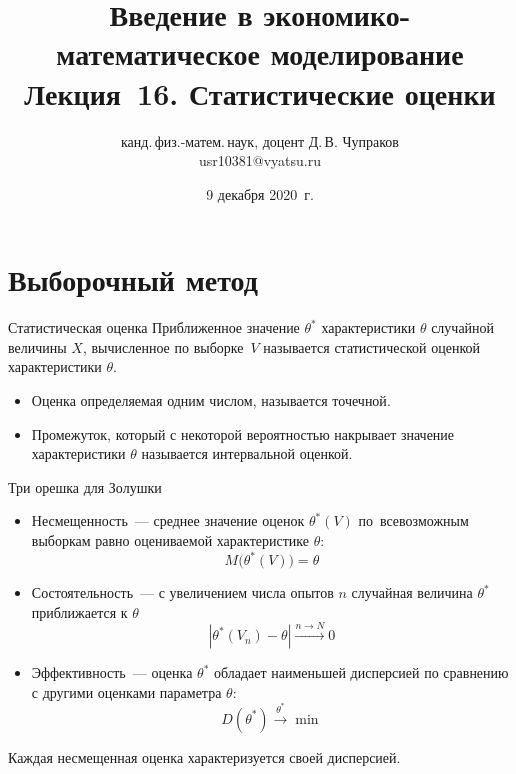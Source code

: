 \documentclass[unicode,11pt,notheorems,xcolor=table]{beamer}
\author[Д.\,В. Чупраков]{канд.\,физ.-матем.\,наук, доцент Д.\,В. Чупраков\\[6pt] usr10381@vyatsu.ru}
\institute[ВятГУ]{ФГБОУ ВО Вятский государственный университет}
\title[Лекция~17. Статистические оценки]{
	Введение в экономико-математическое моделирование\\[12pt]
	Лекция~16. Статистические оценки}
\date{9 декабря 2020~г.}
\begin{document}
\maketitle


\section{Выборочный метод}

\begin{frame}{Статистическая оценка}
    Приближенное значение $\theta^*$ характеристики $\theta$ случайной величины $X$, вычисленное по выборке~$V$ называется \alert{статистической оценкой} характеристики $\theta$.

    \bigskip
    {\centering
    \par}

    \bigskip
    \begin{block}{}
    \begin{itemize}
        \item Оценка определяемая одним числом, называется \alert{точечной}.
        \item Промежуток, который  с некоторой вероятностью накрывает значение характеристики $\theta$ называется \alert{интервальной} оценкой.
    \end{itemize}
    \end{block}
    
\end{frame}

\begin{frame}{Три орешка для Золушки}{}
    \begin{itemize}
        \item \alert{Несмещенность}~--- среднее значение оценок $\theta^*(V)$ по~всевозможным выборкам равно оцениваемой характеристике $\theta$:
            $$
                M \big(\theta^*(V) \big)= \theta
            $$
        
        \item \alert{Состоятельность}~--- с увеличением числа опытов $n$ случайная величина $\theta^*$ приближается к $\theta$
        $$
            |\theta^*(V_n) - \theta| \xrightarrow{n \to N} 0 
        $$
        \item \alert{Эффективность}~--- оценка $\theta^*$ обладает  наименьшей дисперсией по сравнению с другими оценками параметра $\theta$:
        $$
            D(\theta^*) \xrightarrow{\theta^*} \min
        $$
    \end{itemize}
\end{frame}
\begin{frame}{}{}
    Каждая несмещенная оценка характеризуется своей дисперсией.
\end{frame}
\end{document}
